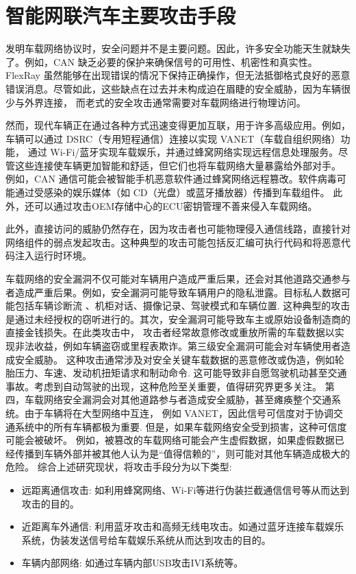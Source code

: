 \section{智能网联汽车主要攻击手段}
发明车载网络协议时，安全问题并不是主要问题。因此，许多安全功能天生就缺失了。例如，CAN 缺乏必要的保护来确保信号的可用性、机密性和真实性\cite{woo2014practical}。
FlexRay 虽然能够在出现错误的情况下保持正确操作，但无法抵御格式良好的恶意错误消息\cite{kleberger2011security}。尽管如此，这些缺点在过去并未构成迫在眉睫的安全威胁，因为车辆很少与外界连接，
而老式的安全攻击通常需要对车载网络进行物理访问。

然而，现代车辆正在通过各种方式迅速变得更加互联，用于许多高级应用。例如，车辆可以通过 DSRC（专用短程通信）连接以实现 VANET（车载自组织网络）功能，
通过 Wi-Fi/蓝牙实现车载娱乐，并通过蜂窝网络实现远程信息处理服务。尽管这些连接使车辆更加智能和舒适，但它们也将车载网络大量暴露给外部对手。
例如，CAN 通信可能会被智能手机恶意软件通过蜂窝网络远程篡改\cite{woo2014practical}。软件病毒可能通过受感染的娱乐媒体（如 CD（光盘）或蓝牙播放器）传播到车载组件。
此外，还可以通过攻击OEM存储中心的ECU密钥管理不善来侵入车载网络。

此外，直接访问的威胁仍然存在，因为攻击者也可能物理侵入通信线路，直接针对网络组件的弱点发起攻击。这种典型的攻击可能包括反汇编可执行代码和将恶意代码注入运行时环境。

车载网络的安全漏洞不仅可能对车辆用户造成严重后果，还会对其他道路交通参与者造成严重后果。例如，安全漏洞可能导致车辆用户的隐私泄露。目标私人数据可能包括车辆诊断流
、机柜对话、摄像记录、驾驶模式和车辆位置\cite{amoozadeh2015security}. 
这种典型的攻击是通过未经授权的窃听进行的。其次，安全漏洞可能导致车主或原始设备制造商的直接金钱损失。在此类攻击中，
攻击者经常故意修改或重放所需的车载数据以实现非法收益，例如车辆盗窃或里程表欺诈。第三级安全漏洞可能会对车辆使用者造成安全威胁。
这种攻击通常涉及对安全关键车载数据的恶意修改或伪造，例如轮胎压力、车速、发动机扭矩请求和制动命令. 
这可能导致非自愿驾驶机动甚至交通事故。考虑到自动驾驶的出现，这种危险至关重要，值得研究界更多关注。
第四，车载网络安全漏洞会对其他道路参与者造成安全威胁，甚至瘫痪整个交通系统。由于车辆将在大型网络中互连，
例如 VANET，因此信号可信度对于协调交通系统中的所有车辆都极为重要\cite{harding2014vehicle}.
 但是，如果车载网络安全受到损害，这种可信度可能会被破坏。
 例如，被篡改的车载网络可能会产生虚假数据，如果虚假数据已经传播到车辆外部并被其他人认为是“值得信赖的”，则可能对其他车辆造成极大的危险。
综合上述研究现状，将攻击手段分为以下类型:
\begin{itemize}
    \item 远距离通信攻击: 如利用蜂窝网络、Wi-Fi等进行伪装拦截通信信号等从而达到攻击的目的。
    \item 近距离车外通信: 利用蓝牙攻击和高频无线电攻击。如通过蓝牙连接车载娱乐系统，伪装发送信号给车载娱乐系统从而达到攻击的目的。
    \item 车辆内部网络: 如通过车辆内部USB攻击IVI系统等。
\end{itemize}

